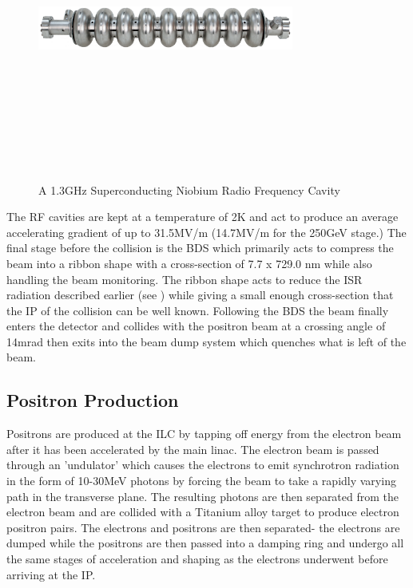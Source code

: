 \begin{figure}
  \centering
  \includegraphics[width=0.75\textwidth,height=10cm,keepaspectratio]{fig/Cavity}
  \caption[Superconducting Cavities For The ILC]{A 1.3GHz Superconducting Niobium Radio Frequency Cavity \cite{ILCTDR}}
  \label{Fig:cavity}
\end{figure}
The \ac{RF} cavities are kept at a temperature of 2K and act to produce an average accelerating gradient of up to 31.5MV/m (14.7MV/m for the 250GeV stage.)  The final stage before the collision is the \ac{BDS} which primarily acts to compress the beam into a ribbon shape with a cross-section of 7.7 x 729.0 nm while also handling the beam monitoring. The ribbon shape acts to reduce the \ac{ISR} radiation described earlier (see ) while giving a small enough cross-section that the \ac{IP} of the collision can be well known. Following the \ac{BDS} the beam finally enters the detector and collides with the positron beam at a crossing angle of 14mrad then exits into the beam dump system which quenches what is left of the beam.
\subsection{Positron Production}
Positrons are produced at the \ac{ILC} by tapping off energy from the electron beam after it has been accelerated by the main linac. The electron beam is passed through an 'undulator' which causes the electrons to emit synchrotron radiation in the form of 10-30MeV photons by forcing the beam to take a rapidly varying path in the transverse plane. The resulting photons are then separated from the electron beam and are collided with a Titanium alloy target to produce electron positron pairs. The electrons and positrons are then separated- the electrons are dumped while the positrons are then passed into a damping ring and undergo all the same stages of acceleration and shaping as the electrons underwent before arriving at the \ac{IP}.
